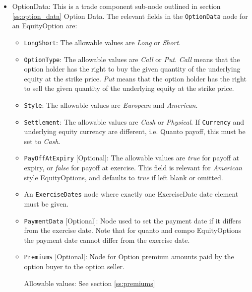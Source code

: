 \begin{itemize}
	\item OptionData: This is a trade component sub-node outlined in section \ref{ss:option_data} Option Data. The relevant fields in the \lstinline!OptionData! node for an EquityOption are:

	
	\begin{itemize}
	\item \lstinline!LongShort!: The allowable values are \emph{Long} or \emph{Short}.

	\item \lstinline!OptionType!: The allowable values are \emph{Call} or \emph{Put}.  \emph{Call} means that the option holder has the right to buy the given quantity of the underlying equity at the strike price.  \emph{Put} means that the option holder has the right to sell the given quantity of the underlying equity at the strike price. 
	
\item  \lstinline!Style!: The allowable values are \emph{European} and \emph{American}.

\item  \lstinline!Settlement!: The allowable values are \emph{Cash} or \emph{Physical}. If
\lstinline!Currency! and underlying equity currency are different, i.e. Quanto payoff, this
must be set to \emph{Cash}.

\item \lstinline!PayOffAtExpiry! [Optional]: The allowable values are \emph{true} for payoff at expiry, or \emph{false} for payoff at exercise. This field is relevant for \emph{American} style EquityOptions, and defaults to \emph{true} if left blank or omitted. 

\item An \lstinline!ExerciseDates! node where exactly one ExerciseDate date element must be given. 

\item \lstinline!PaymentData! [Optional]: Node used to set the payment date if it differs from the exercise date. Note that for quanto and compo EquityOptions the payment date cannot differ from the exercise date.

\item \lstinline!Premiums! [Optional]: Node for Option premium amounts paid by the option buyer to the option seller.

Allowable values:  See section \ref{ss:premiums}

\end{itemize}
	


\end{itemize}
